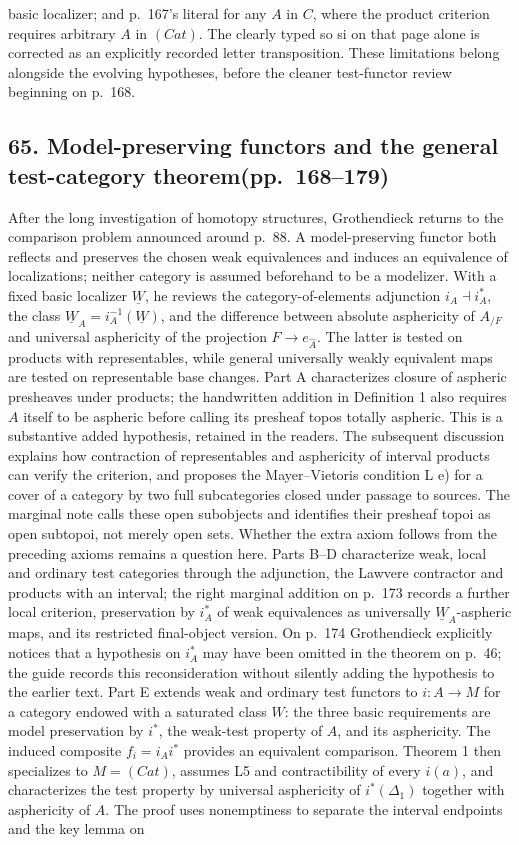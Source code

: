 basic localizer; and p.~167's literal for any $A$ in $C$, where the product criterion requires arbitrary $A$ in $(Cat)$. The clearly typed so si on that page alone is corrected as an explicitly recorded letter transposition. These limitations belong alongside the evolving hypotheses, before the cleaner test-functor review beginning on p.~168.


\subsection*{65. Model-preserving functors and the general test-category theorem\newline (pp.~168--179)}
After the long investigation of homotopy structures, Grothendieck returns to the comparison problem announced around p.~88. A model-preserving functor both reflects and preserves the chosen weak equivalences and induces an equivalence of localizations; neither category is assumed beforehand to be a modelizer. With a fixed basic localizer $\underline W$, he reviews the category-of-elements adjunction $i_A\dashv i_A^*$, the class $\underline W_A=i_A^{-1}(\underline W)$, and the difference between absolute asphericity of $A_{/F}$ and universal asphericity of the projection $F\to e_{\widehat A}$. The latter is tested on products with representables, while general universally weakly equivalent maps are tested on representable base changes. Part A characterizes closure of aspheric presheaves under products; the handwritten addition in Definition 1 also requires $A$ itself to be aspheric before calling its presheaf topos totally aspheric. This is a substantive added hypothesis, retained in the readers. The subsequent discussion explains how contraction of representables and asphericity of interval products can verify the criterion, and proposes the Mayer--Vietoris condition L e) for a cover of a category by two full subcategories closed under passage to sources. The marginal note calls these open subobjects and identifies their presheaf topoi as open subtopoi, not merely open sets. Whether the extra axiom follows from the preceding axioms remains a question here. Parts B--D characterize weak, local and ordinary test categories through the adjunction, the Lawvere contractor and products with an interval; the right marginal addition on p.~173 records a further local criterion, preservation by $i_A^*$ of weak equivalences as universally $\underline W_A$-aspheric maps, and its restricted final-object version. On p.~174 Grothendieck explicitly notices that a hypothesis on $i_A^*$ may have been omitted in the theorem on p.~46; the guide records this reconsideration without silently adding the hypothesis to the earlier text. Part E extends weak and ordinary test functors to $i:A\to M$ for a category endowed with a saturated class $W$: the three basic requirements are model preservation by $i^*$, the weak-test property of $A$, and its asphericity. The induced composite $f_i=i_Ai^*$ provides an equivalent comparison. Theorem 1 then specializes to $M=(Cat)$, assumes L5 and contractibility of every $i(a)$, and characterizes the test property by universal asphericity of $i^*(\Delta_1)$ together with asphericity of $A$. The proof uses nonemptiness to separate the interval endpoints and the key lemma on 